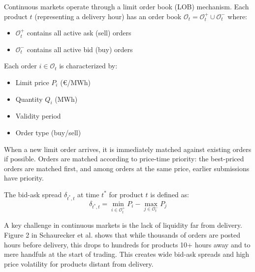 \documentclass[10pt,twocolumn]{article}
\begin{document}
Continuous markets operate through a limit order book (LOB) mechanism. Each product $t$ (representing a delivery hour) has an order book $\mathcal{O}_t = \mathcal{O}^+_t \cup \mathcal{O}^-_t$ where:
\begin{itemize}
\item $\mathcal{O}^+_t$ contains all active ask (sell) orders
\item $\mathcal{O}^-_t$ contains all active bid (buy) orders
\end{itemize}

Each order $i \in \mathcal{O}_t$ is characterized by:
\begin{itemize}
\item Limit price $P_i$ (€/MWh)
\item Quantity $Q_i$ (MWh)
\item Validity period
\item Order type (buy/sell)
\end{itemize}

When a new limit order arrives, it is immediately matched against existing orders if possible. Orders are matched according to price-time priority: the best-priced orders are matched first, and among orders at the same price, earlier submissions have priority.

The bid-ask spread $\delta_{t^*,t}$ at time $t^*$ for product $t$ is defined as:
\begin{equation}
\delta_{t^*,t} = \min_{i \in \mathcal{O}^+_t} P_i - \max_{j \in \mathcal{O}^-_t} P_j
\end{equation}

A key challenge in continuous markets is the lack of liquidity far from delivery. Figure 2 in Schaurecker et al.\cite{schaurecker2025maximizing} shows that while thousands of orders are posted hours before delivery, this drops to hundreds for products 10+ hours away and to mere handfuls at the start of trading. This creates wide bid-ask spreads and high price volatility for products distant from delivery.



\end{document}
